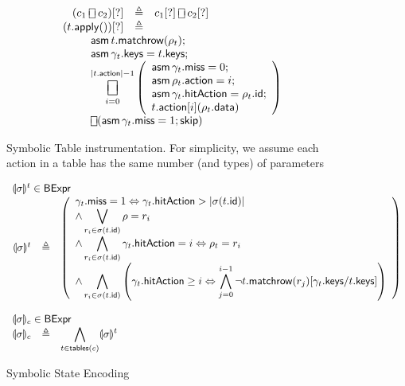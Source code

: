 \documentclass{article}
\newcommand{\BExpr}{\mathsf{BExpr}}
\newcommand{\action}{\mathsf{action}}
\newcommand{\keys}{\mathsf{keys}}
\newcommand{\data}{\mathsf{data}}
\newcommand{\id}{\mathsf{id}}
\newcommand{\hitAction}{\mathsf{hitAction}}
\newcommand{\miss}{\mathsf{miss}}
\newcommand{\assume}{\mathop{\mathsf{asm}}}
\newcommand{\apply}{\mathsf{apply}}
\newcommand{\choiceop}{\rotatebox[origin=c]{90}{$\sqsubset\!\!\!\sqsupset$}}
\newcommand{\choice}{\mathbin{\choiceop}}
\DeclareMathOperator*{\bigchoice}{\scalerel*{\choiceop}{\sum}}
\newcommand{\SKIP}{\mathsf{skip}}
\newcommand{\state}[1]{\llparenthesis#1\rrparenthesis}
\newcommand{\instr}{[?]}
\newcommand{\matchrow}{\mathsf{matchrow}}
\newcommand{\tables}{\mathop{\mathsf{tables}}}
\begin{document}
\begin{figure}[htp]
\[\begin{array}{r >{\triangleq}cl}
  (c_1 \choice c_2)\instr && c_1\instr \choice c_2\instr\\
  (t.\apply())\instr &&\\
  \multicolumn{3}{l}{
    \qquad
    \begin{array}[t]{l} \displaystyle
      \assume t.\matchrow(\rho_t); \\
      \assume \gamma_t.\keys = t.\keys; \\
    \displaystyle \bigchoice_{i=0}^{|t.\action| -1}
    \left(\begin{array}{l}
      \assume \gamma_t.\miss = 0;\\
      \assume \rho_t.\action = i;\\
      \assume \gamma_t.\hitAction = \rho_t.\id;\\
      t.\action[i](\rho_t.\data)
    \end{array}\right)\\
    \choice (\assume \gamma_t.\miss = 1; \SKIP)  \\
  \end{array}}
  \end{array}
  \]
  \caption{Symbolic Table instrumentation. For simplicity, we
    assume each action in a table has the same number (and types) of parameters}
  \label{fig:table-instrument}
\end{figure}

\begin{figure}[htp]
  \[\begin{array}{r cl}
  \multicolumn{3}{l}{\state\sigma^t \in \BExpr} \\
  \state\sigma^t & \triangleq &
  \left(\begin{array}{>{\displaystyle}l}
  \gamma_t.\miss = 1 \Leftrightarrow \gamma_t.\hitAction > |\sigma(t.\id)| \\
  \wedge \bigvee_{r_i \in \sigma(t.\id)} \rho = r_i  \\
  \wedge \bigwedge_{r_i \in \sigma(t.\id)} \gamma_t.\hitAction = i \Leftrightarrow \rho_t = r_i \\
  \wedge \bigwedge_{r_i \in \sigma(t.\id)} \left(\gamma_t.\hitAction \geq i \Leftrightarrow \bigwedge_{j=0}^{i-1} \neg t.\matchrow(r_j)[\gamma_t.\keys/t.\keys]\right)\\
  \end{array}\right)\\\\

  \multicolumn{3}{l}{\state\sigma_c \in \BExpr} \\
  \state\sigma_c &\triangleq
  & \displaystyle\bigwedge_{ t \in \tables(c) } \state\sigma^t
  \end{array}
  \]
  \caption{Symbolic State Encoding}
  \label{fig:table-instrument}
\end{figure}
\end{document}
